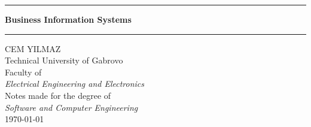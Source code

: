 \documentclass[a4paper, 12pt]{article}
\newcommand{\coloredrule}[2][tugblue]{%
  \textcolor{#1}{\rule{\linewidth}{#2}}%
}
\theoremstyle{plain}
\theoremstyle{definition}
\theoremstyle{remark}
\begin{document}
	\begin{titlepage}
	        \vspace*{0.8cm}
	        \begin{center}
	                \coloredrule{2pt}\par
	                \vskip 0.6cm
	                \textbf{\Huge Business Information Systems}\par
	                \vskip 0.3cm
	                \coloredrule{2pt}\par
	
	                \vskip 3cm
	
	                
	
	                \vspace{3cm} %
	                \Large CEM YILMAZ \\
	                \Large Technical University of Gabrovo \\
	                \Large Faculty of \\
	                \Large\textit{Electrical Engineering and Electronics}\\
	
	                \vspace{2cm}
	                \Large Notes made for the degree of\\
	                \Large \textit{Software and Computer Engineering}\\
	                \Large \today \\
	                \vspace{0.5cm}
	
	                \vfill  %
	        \end{center}
	\end{titlepage}
	
	\tableofcontents
	\newpage
\end{document}
